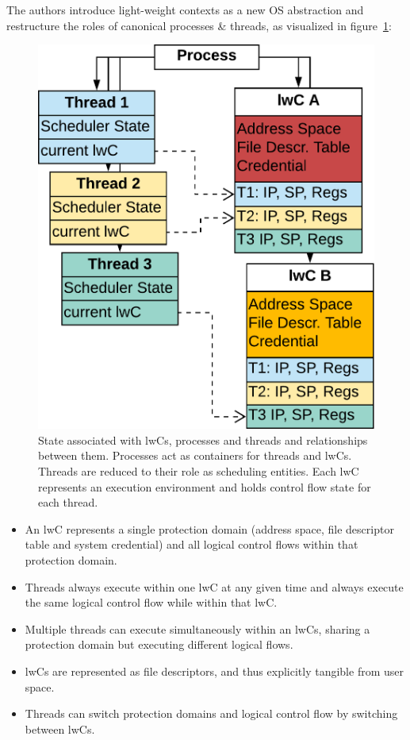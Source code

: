 \documentclass[10pt,twocolumn,letter]{article}
\begin{document}
The authors introduce light-weight contexts as a new OS abstraction and restructure the roles of canonical processes \& threads, as visualized in figure~\ref{design:fig:lwcprocthreadrelationship}:

\begin{figure}[h]
  \label{design:fig:lwcprocthreadrelationship}
  \includegraphics[width=\linewidth]{fig/lwc-proc-thread-relationship}
  \caption{
    State associated with lwCs, processes and threads and relationships between them.
    Processes act as containers for threads and lwCs.
    Threads are reduced to their role as scheduling entities.
    Each lwC represents an execution environment and holds control flow state for each thread.
  }
\end{figure}

\begin{itemize}
\item An lwC represents a single protection domain (address space, file descriptor table and system credential) and all logical control flows within that protection domain.
\item Threads always execute within one lwC at any given time and always execute the same logical control flow while within that lwC.
\item Multiple threads can execute simultaneously within an lwCs, sharing a protection domain but executing different logical flows.
\item lwCs are represented as file descriptors, and thus explicitly tangible from user space.
\item Threads can switch protection domains and logical control flow by switching between lwCs.
\end{itemize}
\end{document}
